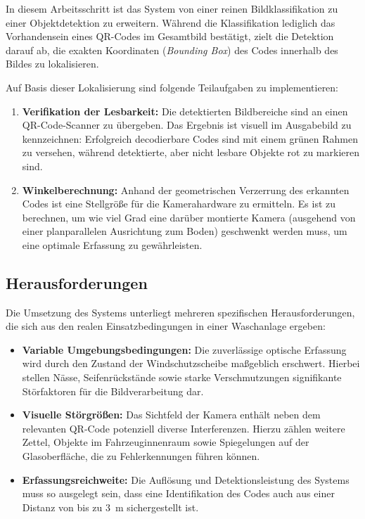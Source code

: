\documentclass[
    a4paper,        %
    11pt,           %
    ngerman,        %
    parskip=half,   %
    listof=totoc,   %
    bibliography=totoc %
]{scrartcl}
\begin{document}
In diesem Arbeitsschritt ist das System von einer reinen Bildklassifikation zu einer Objektdetektion zu erweitern. Während die Klassifikation lediglich das Vorhandensein eines QR-Codes im Gesamtbild bestätigt, zielt die Detektion darauf ab, die exakten Koordinaten (\textit{Bounding Box}) des Codes innerhalb des Bildes zu lokalisieren.

Auf Basis dieser Lokalisierung sind folgende Teilaufgaben zu implementieren:
\begin{enumerate}
    \item \textbf{Verifikation der Lesbarkeit:} Die detektierten Bildbereiche sind an einen QR-Code-Scanner zu übergeben. Das Ergebnis ist visuell im Ausgabebild zu kennzeichnen: Erfolgreich decodierbare Codes sind mit einem grünen Rahmen zu versehen, während detektierte, aber nicht lesbare Objekte rot zu markieren sind.
    \item \textbf{Winkelberechnung:} Anhand der geometrischen Verzerrung des erkannten Codes ist eine Stellgröße für die Kamerahardware zu ermitteln. Es ist zu berechnen, um wie viel Grad eine darüber montierte Kamera (ausgehend von einer planparallelen Ausrichtung zum Boden) geschwenkt werden muss, um eine optimale Erfassung zu gewährleisten.
\end{enumerate}

\subsection{Herausforderungen} \label{subsec:herausforderungen}
Die Umsetzung des Systems unterliegt mehreren spezifischen Herausforderungen, die sich aus den realen Einsatzbedingungen in einer Waschanlage ergeben:

\begin{itemize}
    \item \textbf{Variable Umgebungsbedingungen:} Die zuverlässige optische Erfassung wird durch den Zustand der Windschutzscheibe maßgeblich erschwert. Hierbei stellen Nässe, Seifenrückstände sowie starke Verschmutzungen signifikante Störfaktoren für die Bildverarbeitung dar.
    \item \textbf{Visuelle Störgrößen:} Das Sichtfeld der Kamera enthält neben dem relevanten QR-Code potenziell diverse Interferenzen. Hierzu zählen weitere Zettel, Objekte im Fahrzeuginnenraum sowie Spiegelungen auf der Glasoberfläche, die zu Fehlerkennungen führen können.
    \item \textbf{Erfassungsreichweite:} Die Auflösung und Detektionsleistung des Systems muss so ausgelegt sein, dass eine Identifikation des Codes auch aus einer Distanz von bis zu \SI{3}{\meter} sichergestellt ist.
\end{itemize}
\end{document}
